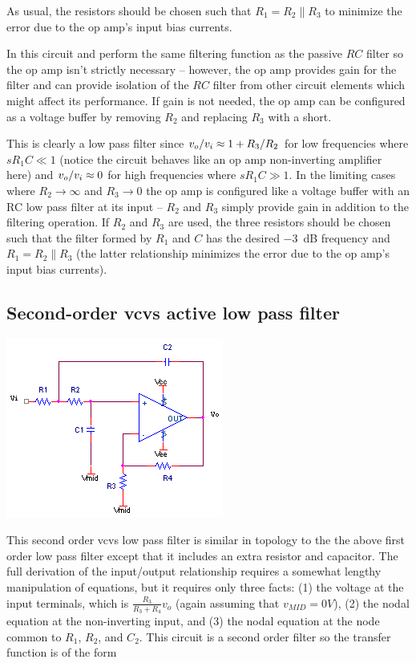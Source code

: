 As usual, the resistors should be chosen such that \(R_1 = R_2 \parallel R_3\) to minimize the error due to the op amp's input bias currents.

In this circuit \R[1] and \C perform the same filtering function as the passive \(RC\) filter so the op amp isn't strictly necessary -- however, the op amp provides gain for the filter and can provide isolation of the \(RC\) filter from other circuit elements which might affect its performance.
If gain is not needed, the op amp can be configured as a voltage buffer by removing $R_2$ and replacing $R_3$ with a short.

This is clearly a low pass filter since $\vout/\vin \approx 1 + R_3/R_2$ for low frequencies where $sR_1 C \ll 1$ (notice the circuit behaves like an op amp non-inverting amplifier here) and $\vout/\vin \approx 0$ for high frequencies where $sR_{1}C \gg 1$.
In the limiting cases where $R_2 \to \infty$ and $R_3 \to 0$ the op amp is configured like a voltage buffer with an RC low pass filter at its input -- $R_2$ and $R_3$ simply provide gain in addition to the filtering operation.
If $R_2$ and $R_3$ are used, the three resistors should be chosen such that the filter formed by $R_1$ and $C$ has the desired \SI{-3}{dB} frequency and $R_1 = R_2 \parallel R_3$ (the latter relationship minimizes the error due to the op amp's input bias currents).

\subsection{Second-order \ac{vcvs} active low pass filter}
\begin{center}
	\includegraphics{schematics/2ndorder_vcvs_LPfilter.PNG}
\end{center}
This second order \ac{vcvs} low pass filter is similar in topology to the the above first order low pass filter except that it includes an extra resistor and capacitor. The full derivation of the input/output relationship requires a somewhat lengthy manipulation of equations, but it requires only three facts: (1) the voltage at the input terminals, which is $\frac{R_{3}}{R_{3}+R_{4}}v_{o}$ (again assuming that $v_{MID} = 0V$), (2) the nodal equation at the non-inverting input, and (3) the nodal equation at the node common to $R_{1}$, $R_{2}$, and $C_{2}$. This circuit is a second order filter so the transfer function is of the form

